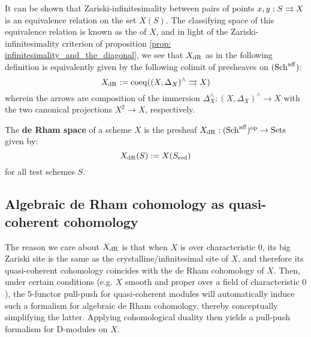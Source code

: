             It can be shown that Zariski-infinitesimality between pairs of points $x, y: S \rightrightarrows X$ is an equivalence relation on the set $X(S)$. The classifying space of this equivalence relation is known as the  of $X$, and in light of the Zariski-infinitesimality criterion of proposition \ref{prop: infinitesimality_and_the_diagonal}, we see that $X_{\mathrm{dR}}$ as in the following definition is equivalently given by the following colimit of presheaves on $(\mathrm{Sch}^{\mathrm{aff}})$:
                $$X_{\mathrm{dR}} := \operatorname{coeq}( (X, \Delta_X)^{\wedge} \rightrightarrows X )$$
            wherein the arrows are composition of the immersion $\Delta_X^{\wedge}: (X, \Delta_X)^{\wedge} \to X$ with the two canonical  projections $X^2 \to X$, respectively.
            \begin{definition} \label{def: de_rham_spaces}
                The \textbf{de Rham space} of a scheme $X$ is the presheaf $X_{\mathrm{dR}}: (\mathrm{Sch}^{\mathrm{aff}})^{\mathrm{op}} \to \mathrm{Sets}$ given by:
                    $$X_{\mathrm{dR}}(S) := X(S_{\mathrm{red}})$$
                for all test schemes $S$.
            \end{definition}

        \subsection{Algebraic de Rham cohomology as quasi-coherent cohomology}
            The reason we care about $X_{\mathrm{dR}}$ is that when $X$ is over characteristic $0$, its big Zariski site is the same as the crystalline/infinitesimal site of $X$, and therefore its quasi-coherent cohomology coincides with the de Rham cohomology of $X$. Then, under certain conditions (e.g. $X$ smooth and proper over a field of characteristic $0$), the $5$-functor pull-push for quasi-coherent modules will automatically induce such a formalism for algebraic de Rham cohomology, thereby conceptually simplifying the latter. Applying cohomological duality then yields a pull-push formalism for D-modules on $X$.
    
    \printbibliography

